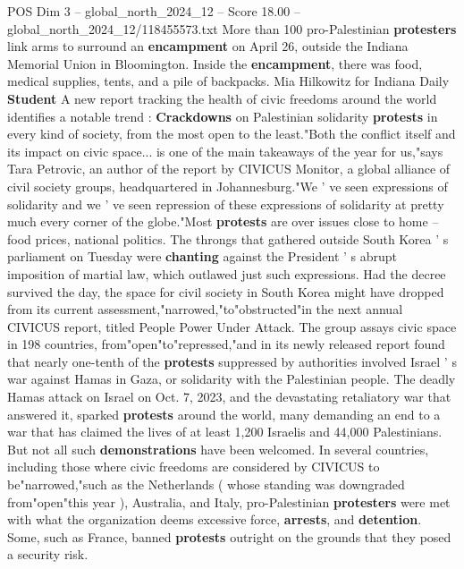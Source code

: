 \begin{textsample}{POS Dim 3 – global\_north\_2024\_12 – Score 18.00 – global\_north\_2024\_12/118455573.txt}  \label{ex:f3_pos_210}
More than 100 pro-Palestinian \textbf{protesters} link arms to surround an \textbf{encampment} on April 26, outside the Indiana Memorial Union in Bloomington.
Inside the \textbf{encampment}, there was food, medical supplies, tents, and a pile of backpacks.
Mia Hilkowitz for Indiana Daily \textbf{Student} A new report tracking the health of civic freedoms around the world identifies a notable trend : \textbf{Crackdowns} on Palestinian solidarity \textbf{protests} in every kind of society, from the most open to the least."Both the conflict itself and its impact on civic space... is one of the main takeaways of the year for us,"says Tara Petrovic, an author of the report by CIVICUS Monitor, a global alliance of civil society groups, headquartered in Johannesburg."We ' ve seen expressions of solidarity and we ' ve seen repression of these expressions of solidarity at pretty much every corner of the globe."Most \textbf{protests} are over issues close to home -- food prices, national politics.
The throngs that gathered outside South Korea ' s parliament on Tuesday were \textbf{chanting} against the President ' s abrupt imposition of martial law, which outlawed just such expressions.
Had the decree survived the day, the space for civil society in South Korea might have dropped from its current assessment,"narrowed,"to"obstructed"in the next annual CIVICUS report, titled People Power Under Attack.
The group assays civic space in 198 countries, from"open"to"repressed,"and in its newly released report found that nearly one-tenth of the \textbf{protests} suppressed by authorities involved Israel ' s war against Hamas in Gaza, or solidarity with the Palestinian people.
The deadly Hamas attack on Israel on Oct. 7, 2023, and the devastating retaliatory war that answered it, sparked \textbf{protests} around the world, many demanding an end to a war that has claimed the lives of at least 1,200 Israelis and 44,000 Palestinians.
But not all such \textbf{demonstrations} have been welcomed.
In several countries, including those where civic freedoms are considered by CIVICUS to be"narrowed,"such as the Netherlands ( whose standing was downgraded from"open"this year ), Australia, and Italy, pro-Palestinian \textbf{protesters} were met with what the organization deems excessive force, \textbf{arrests}, and \textbf{detention}.
Some, such as France, banned \textbf{protests} outright on the grounds that they posed a security risk.

\end{textsample}
